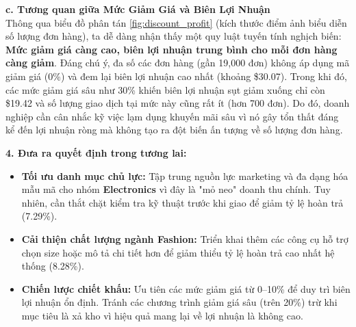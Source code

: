 \textbf{c. Tương quan giữa Mức Giảm Giá và Biên Lợi Nhuận}
\\
Thông qua biểu đồ phân tán \ref{fig:discount_profit} (kích thước điểm ảnh biểu diễn số lượng đơn hàng), ta dễ dàng nhận thấy một quy luật tuyến tính nghịch biến: \textbf{Mức giảm giá càng cao, biên lợi nhuận trung bình cho mỗi đơn hàng càng giảm}.
Đáng chú ý, đa số các đơn hàng (gần 19,000 đơn) không áp dụng mã giảm giá (0\%) và đem lại biên lợi nhuận cao nhất (khoảng \$30.07). Trong khi đó, các mức giảm giá sâu như 30\% khiến biên lợi nhuận sụt giảm xuống chỉ còn \$19.42 và số lượng giao dịch tại mức này cũng rất ít (hơn 700 đơn). Do đó, doanh nghiệp cần cân nhắc kỹ việc lạm dụng khuyến mãi sâu vì nó gây tổn thất đáng kể đến lợi nhuận ròng mà không tạo ra đột biến ấn tượng về số lượng đơn hàng.

\vspace{0.3cm}
\noindent\textbf{4. Đưa ra quyết định trong tương lai:}
\begin{itemize}
    \item \textbf{Tối ưu danh mục chủ lực:} Tập trung nguồn lực marketing và đa dạng hóa mẫu mã cho nhóm \textbf{Electronics} vì đây là "mỏ neo" doanh thu chính. Tuy nhiên, cần thắt chặt kiểm tra kỹ thuật trước khi giao để giảm tỷ lệ hoàn trả (7.29\%).
    \item \textbf{Cải thiện chất lượng ngành Fashion:} Triển khai thêm các công cụ hỗ trợ chọn size hoặc mô tả chi tiết hơn để giảm thiểu tỷ lệ hoàn trả cao nhất hệ thống (8.28\%).
    \item \textbf{Chiến lược chiết khấu:} Ưu tiên các mức giảm giá từ 0--10\% để duy trì biên lợi nhuận ổn định. Tránh các chương trình giảm giá sâu (trên 20\%) trừ khi mục tiêu là xả kho vì hiệu quả mang lại về lợi nhuận là không cao.
\end{itemize}


